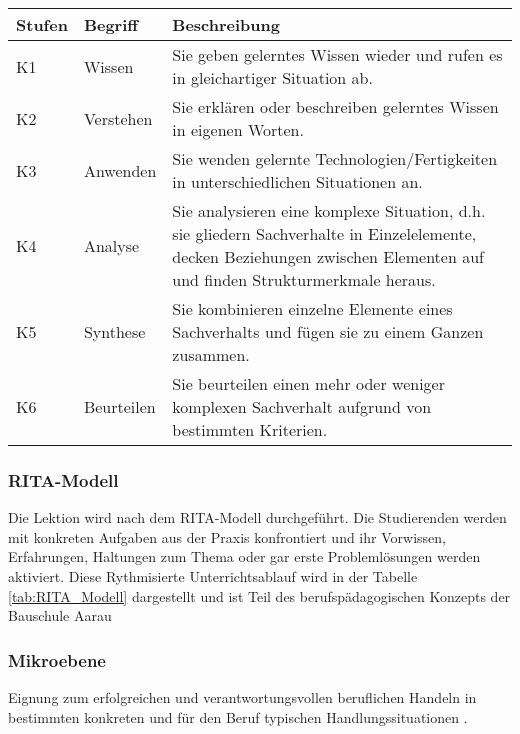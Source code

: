 \documentclass[
11pt,
captions=tableheading,
smallheadings,
headsepline,
footsepline, 
captions=tableheading,
parskip=half-,
]{scrartcl}
\begin{document}
\begin{table}[H]
    \centering
    \label{tab:Bloom}
    \caption{Kognitive Taxonomiestufen nach Bloom \cite{bloom1956taxonomy}, adaptiert von \cite{BerufspädagogischesKonzept_BauschuleAarau}.}
    \begin{longtable}{@{}llp{12cm}@{}}
        \toprule
        \textbf{Stufen} & \textbf{Begriff} & \textbf{Beschreibung} \\ 
        \midrule
        K1 & Wissen & Sie geben gelerntes Wissen wieder und rufen es in gleichartiger Situation ab. \\ 
        K2 & Verstehen & Sie erklären oder beschreiben gelerntes Wissen in eigenen Worten. \\ 
        K3 & Anwenden & Sie wenden gelernte Technologien/Fertigkeiten in unterschiedlichen Situationen an. \\ 
        K4 & Analyse & Sie analysieren eine komplexe Situation, d.h. sie gliedern Sachverhalte in Einzelelemente, decken Beziehungen zwischen Elementen auf und finden Strukturmerkmale heraus. \\ 
        K5 & Synthese & Sie kombinieren einzelne Elemente eines Sachverhalts und fügen sie zu einem Ganzen zusammen. \\ 
        K6 & Beurteilen & Sie beurteilen einen mehr oder weniger komplexen Sachverhalt aufgrund von bestimmten Kriterien. \\ 
        \bottomrule
    \end{longtable}
\end{table}




\subsubsection{RITA-Modell}
Die Lektion wird nach dem RITA-Modell durchgeführt. 
Die Studierenden werden mit konkreten Aufgaben aus der Praxis konfrontiert und ihr Vorwissen, Erfahrungen, Haltungen zum Thema oder gar erste Problemlösungen werden aktiviert.
Diese Rythmisierte Unterrichtsablauf wird in der Tabelle \cref{tab:RITA_Modell} dargestellt und ist Teil des berufspädagogischen Konzepts der Bauschule Aarau \cite{BerufspädagogischesKonzept_BauschuleAarau}


\subsubsection{Mikroebene}
Eignung zum erfolgreichen und verantwortungsvollen beruflichen Handeln in bestimmten konkreten und für den Beruf typischen Handlungssituationen \cite{BerufspädagogischesKonzept_BauschuleAarau}.
\end{document}

